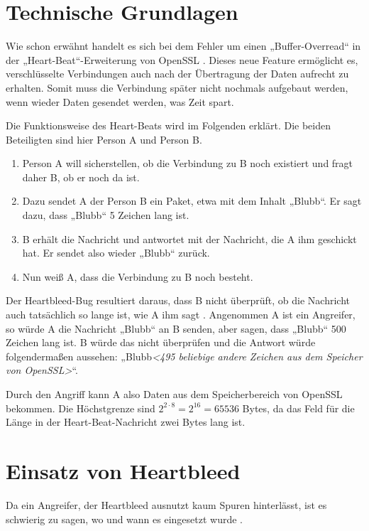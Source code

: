 \documentclass[12pt]{article}
\begin{document}
\section{Technische Grundlagen}

Wie schon erwähnt handelt es sich bei dem Fehler um einen „Buffer-Overread“ in der „Heart-Beat“-Erweiterung von OpenSSL \citep{cassidy_diagnosis_2014}. Dieses neue Feature ermöglicht es, verschlüsselte Verbindungen auch nach der Übertragung der Daten aufrecht zu erhalten. Somit muss die Verbindung später nicht nochmals aufgebaut werden, wenn wieder Daten gesendet werden, was Zeit spart. 

Die Funktionsweise des Heart-Beats wird im Folgenden erklärt. Die beiden Beteiligten sind hier Person A und Person B.
\begin{enumerate}
\item Person A will sicherstellen, ob die Verbindung zu B noch existiert und fragt daher B, ob er noch da ist.
\item Dazu sendet A der Person B ein Paket, etwa mit dem Inhalt „Blubb“. Er sagt dazu, dass „Blubb“ 5 Zeichen lang ist.
\item B erhält die Nachricht und antwortet mit der Nachricht, die A ihm geschickt hat. Er sendet also wieder „Blubb“ zurück. 
\item Nun weiß A, dass die Verbindung zu B noch besteht.
\end{enumerate}

Der Heartbleed-Bug resultiert daraus, dass B nicht überprüft, ob die Nachricht auch tatsächlich so lange ist, wie A ihm sagt \citep{limer_how_2014}. Angenommen A ist ein Angreifer, so würde A die Nachricht „Blubb“ an B senden, aber sagen, dass „Blubb“ 500 Zeichen lang ist. B würde das nicht überprüfen und die Antwort würde folgendermaßen aussehen: „Blubb\textit{<495 beliebige andere Zeichen aus dem Speicher von OpenSSL>}“.

Durch den Angriff kann A also Daten aus dem Speicherbereich von OpenSSL bekommen. Die Höchstgrenze sind $2^{2\cdot8} = 2^{16} = 65536$ Bytes, da das Feld für die Länge in der Heart-Beat-Nachricht zwei Bytes lang ist. 

\section{Einsatz von Heartbleed}

Da ein Angreifer, der Heartbleed ausnutzt kaum Spuren hinterlässt, ist es schwierig zu sagen, wo und wann es eingesetzt wurde \citep{malloy_blogs_2014}.
\end{document}
